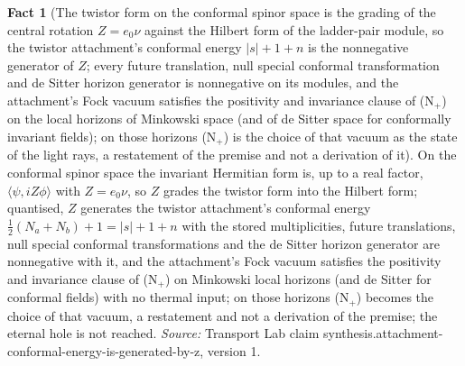 \documentclass[11pt]{article}
\theoremstyle{definition}
\newtheorem{fact}[theorem]{Fact}
\theoremstyle{plain}
\providecommand{\ip}{}\renewcommand{\ip}[2]{\langle #1, #2\rangle}
\begin{document}
\begin{fact}[The twistor form on the conformal spinor space is the grading of the central rotation $Z = e_{0}\nu$ against the Hilbert form of the ladder-pair module, so the twistor attachment's conformal energy $|s| + 1 + n$ is the nonnegative generator of $Z$; every future translation, null special conformal transformation and de Sitter horizon generator is nonnegative on its modules, and the attachment's Fock vacuum satisfies the positivity and invariance clause of (N$_{+}$) on the local horizons of Minkowski space (and of de Sitter space for conformally invariant fields); on those horizons (N$_{+}$) is the choice of that vacuum as the state of the light rays, a restatement of the premise and not a derivation of it]\label{c:synthesis.attachment-conformal-energy-is-generated-by-z}
On the conformal spinor space the invariant Hermitian form is, up to a real factor, $\ip{\psi}{iZ\phi}$ with $Z = e_{0}\nu$, so $Z$ grades the twistor form into the Hilbert form; quantised, $Z$ generates the twistor attachment's conformal energy $\tfrac12(N_{a} + N_{b}) + 1 = |s| + 1 + n$ with the stored multiplicities, future translations, null special conformal transformations and the de Sitter horizon generator are nonnegative with it, and the attachment's Fock vacuum satisfies the positivity and invariance clause of (N$_{+}$) on Minkowski local horizons (and de Sitter for conformal fields) with no thermal input; on those horizons (N$_{+}$) becomes the choice of that vacuum, a restatement and not a derivation of the premise; the eternal hole is not reached.
\emph{Source:} Transport Lab claim synthesis.attachment-conformal-energy-is-generated-by-z, version 1.
\end{fact}
\end{document}
